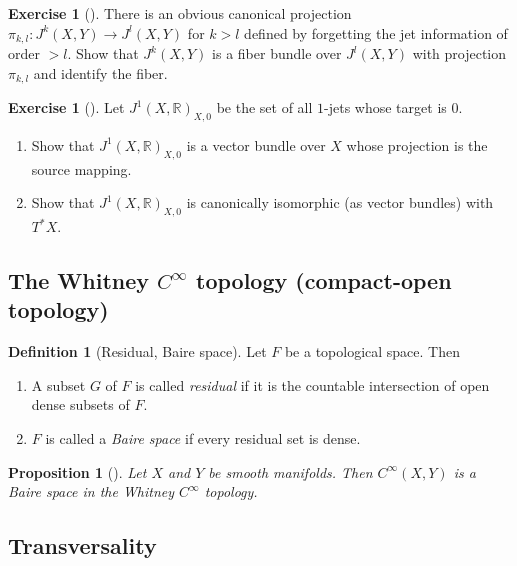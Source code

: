 \documentclass[reqno]{amsart}
\newtheorem{proposition}[theorem]{Proposition}
\theoremstyle{definition}
\newtheorem{definition}[theorem]{Definition}
\newtheorem{exercise}[theorem]{Exercise}
\theoremstyle{remark}
\begin{document}
\begin{exercise}[]
    There is an obvious canonical projection
    $\pi_{k,l} \colon J^{k}(X,Y) \to 
    J^{l}(X,Y)$ for $k > l$ defined by forgetting the
    jet information of order $>l$. Show that
    $J^{k}(X,Y)$ is a fiber bundle over
    $J^{l}(X,Y)$ with projection $\pi_{k,l}$ and identify
    the fiber.
\end{exercise}

\begin{exercise}[]
    Let $J^{1}\left( X,\mathbb{R} \right)_{X,0}$ be
    the set of all $1$-jets whose target is $0$.
    \begin{enumerate}
        \item Show that $J^{1}(X,\mathbb{R})_{X,0}$ is a vector
            bundle over $X$ whose projection is
            the source mapping.
        \item Show that $J^{1}(X,\mathbb{R})_{X,0}$ is canonically
            isomorphic (as vector bundles) with
            $T^{*}X$.
    \end{enumerate}
\end{exercise}

\subsection{The Whitney $C^{\infty}$ topology (compact-open topology)}

\begin{definition}[Residual, Baire space]
    Let $F$ be a topological space.
    Then
    \begin{enumerate}
        \item A subset $G$ of $F$ is called
            \textit{residual} if it is the countable
            intersection of open dense subsets of $F$.
        \item $F$ is called a \textit{Baire space} if
            every residual set is dense.
    \end{enumerate}
\end{definition}

\begin{proposition}[]\label{Sm-Maps-Mfds-Baire}
    Let $X$ and $Y$ be smooth manifolds. Then
    $C^{\infty}(X,Y)$ is a Baire space in the
    Whitney $C^{\infty}$ topology.
\end{proposition}

\subsection{Transversality}
\end{document}
